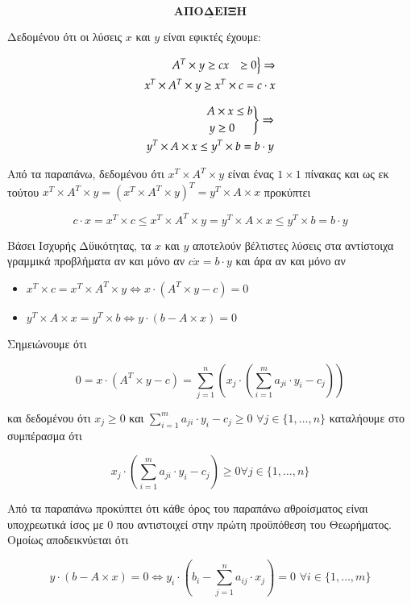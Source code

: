 \documentclass[12pt]{article}
\newcommand{\margin}{\hspace{4pt}}
\newenvironment{rcases}
	{\left.\begin{aligned}}
	{\end{aligned}\right\rbrace}
\begin{document}
\[ \underline{\textbf{ΑΠΟΔΕΙΞΗ}} \]

Δεδομένου ότι οι λύσεις \( x \) και \( y \) είναι εφικτές έχουμε:

\begin{align*}
    \begin{rcases}
        A^T & \times y \geq c
        x & \geq 0
    \end{rcases}
    \Rightarrow \\
    x^T \times A^T \times y \geq x^T \times c = c \cdot x
\end{align*}

\begin{align*}
    \begin{rcases}
        A & \times x \leq b \\
        y & \geq 0
    \end{rcases}
    \Rightarrow \\
    y^T \times A \times x \leq y^T \times b = b \cdot y
\end{align*}

Από τα παραπάνω, δεδομένου ότι \( x^T \times A^T \times y \) είναι ένας \( 1 \times 1 \)
πίνακας και ως εκ τούτου \( x^T \times A^T \times y = (x^T \times A^T \times y)^T = y^T \times A \times x\)
προκύπτει

\[ c \cdot x = x^T \times c \leq x^T \times A^T \times y = y^T \times A \times x \leq y^T \times b = b \cdot y \]

Βάσει Ισχυρής Δϋικότητας, τα \( x \) και \( y \) αποτελούν βέλτιστες λύσεις στα αντίστοιχα
γραμμικά προβλήματα αν και μόνο αν \( c \dot x = b \cdot y \) και άρα αν και μόνο αν

\begin{itemize}
    \item \( x^T \times c = x^T \times A^T \times y \Leftrightarrow x \cdot (A^T \times y - c) = 0 \)
    \item \( y^T \times A \times x = y^T \times b \Leftrightarrow y \cdot (b - A \times x) = 0 \)
\end{itemize}

Σημειώνουμε ότι

\[ 0 = x \cdot (A^T \times y - c)  = \sum_{j = 1}^{n}(x_j \cdot (\sum_{i = 1}^{m} a_{ji} \cdot y_i - c_j)) \]

και δεδομένου ότι \( x_j \geq 0 \) και \( \sum_{i = 1}^{m} a_{ji} \cdot y_i - c_j \geq 0 \)
\( \forall j \in \{1, \ldots, n \} \) καταλήουμε στο συμπέρασμα ότι

\[ x_j \cdot (\sum_{i = 1}^{m} a_{ji} \cdot y_i - c_j) \geq 0 \forall j \in \{ 1, \ldots, n \} \]

Από τα παραπάνω προκύπτει ότι κάθε όρος του παραπάνω αθροίσματος είναι υποχρεωτικά ίσος με 0
που αντιστοιχεί στην πρώτη προϋπόθεση του Θεωρήματος. \\

Ομοίως αποδεικνύεται ότι

\[ y \cdot ( b - A \times x ) = 0 \Leftrightarrow y_i \cdot ( b_i - \sum_{j = 1}^{n} a_{ij} \cdot x_j ) = 0 \margin \forall i \in \{ 1, \ldots, m \} \]

\vspace{2in}

\pagebreak
\end{document}
